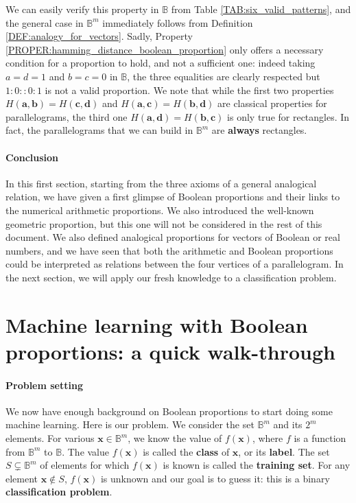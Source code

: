 We can easily verify this property in $\mathbb{B}$ from Table
\ref{TAB:six_valid_patterns}, and the general case in $\mathbb{B}^m$ immediately
follows from Definition \ref{DEF:analogy_for_vectors}. Sadly, Property
\ref{PROPER:hamming_distance_boolean_proportion} only offers a necessary
condition for a proportion to hold, and not a sufficient one: indeed taking $a
= d = 1$ and $b = c =0$ in $\mathbb{B}$, the three equalities are clearly
respected but $1:0::0:1$ is not a valid proportion. We note that
while the first two properties $H(\mathbf{a}, \mathbf{b}) = H(\mathbf{c},
\mathbf{d})$ and $H(\mathbf{a}, \mathbf{c}) = H(\mathbf{b}, \mathbf{d})$ are
classical properties for parallelograms, the third one $H(\mathbf{a},
\mathbf{d}) = H(\mathbf{b}, \mathbf{c})$ is only true for rectangles. In fact,
the parallelograms that we can build in $\mathbb{B}^m$ are \textbf{always}
rectangles.

\paragraph{Conclusion\\}

In this first section, starting from the three axioms of a general analogical
relation, we have given a first glimpse of Boolean proportions and their links
to the numerical arithmetic proportions. We also introduced the well-known
geometric proportion, but this one will not be considered in the rest of this
document. We also defined analogical proportions for vectors of Boolean or real
numbers, and we have seen that both the arithmetic and Boolean proportions
could be interpreted as relations between the four vertices of a parallelogram.
In the next section, we will apply our fresh knowledge to a classification
problem.

\section{Machine learning with Boolean proportions: a quick walk-through}
\label{SEC:machine_learning_with_boolean_proportions}

\paragraph{Problem setting\\}

We now have enough background on Boolean proportions to start doing some
machine learning. Here is our problem. We consider the set $\mathbb{B}^m$ and
its $2^m$ elements. For various $\mathbf{x} \in \mathbb{B}^m$, we know the
value of $f(\mathbf{x})$, where $f$ is a function from $\mathbb{B}^m$ to
$\mathbb{B}$.  The value $f(\mathbf{x})$ is called the \textbf{class} of
$\mathbf{x}$, or its \textbf{label}. The set $S \subsetneq \mathbb{B}^m$ of
elements for which $f(\mathbf{x})$ is known is called the \textbf{training
set}. For any element $\mathbf{x} \notin S$, $f(\mathbf{x})$ is unknown and our
goal is to guess it: this is a binary \textbf{classification problem}.

